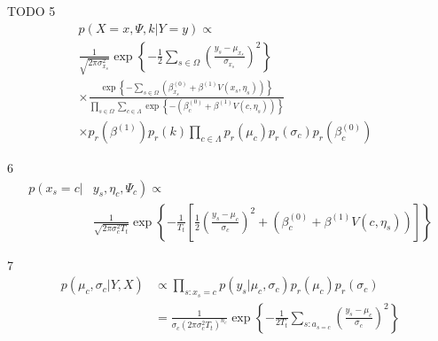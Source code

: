 \documentclass[10pt,letterpaper]{article}
\begin{document}
TODO
5
\begin{equation}
\begin{aligned}
p(X=x, \Psi, k | Y=y) \propto & \\
\frac{1}{\sqrt{2 \pi \sigma_{x_{s}}^{2}}} \exp \left\{-\frac{1}{2} \sum_{s \in \Omega}\left(\frac{y_{s}-\mu_{x_{s}}}{\sigma_{x_{s}}}\right)^{2}\right\} \\
\times \frac{\exp \left\{-\sum_{s \in \Omega}\left(\beta_{x_{s}}^{(0)}+\beta^{(1)} V\left(x_{s}, \eta_{s}\right)\right)\right\}}{\prod_{s \in \Omega} \sum_{c \in \Lambda} \exp \left\{-\left(\beta_{c}^{(0)}+\beta^{(1)} V\left(c, \eta_{s}\right)\right)\right\}} \\
\times p_{r}\left(\beta^{(1)}\right) p_{r}(k) \prod_{c \in \Lambda} p_{r}\left(\mu_{c}\right) p_{r}\left(\sigma_{c}\right) p_{r}\left(\beta_{c}^{(0)}\right)
\end{aligned}
\end{equation}

6
\begin{equation}
\begin{aligned}
p\left(x_{s}=c |\right.&\left.y_{s}, \eta_{c}, \Psi_{c}\right) \propto \\
& \frac{1}{\sqrt{2 \pi \sigma_{c}^{2} T_{t}}} \exp \left\{-\frac{1}{T_{t}}\left[\frac{1}{2}\left(\frac{y_{s}-\mu_{c}}{\sigma_{c}}\right)^{2}+\left(\beta_{c}^{(0)}+\beta^{(1)} V\left(c, \eta_{s}\right)\right)\right]\right\}
\end{aligned}
\end{equation}


7
\begin{equation}
\begin{aligned}
p\left(\mu_{c}, \sigma_{c} | Y, X\right) & \propto \prod_{s: x_{s}=c} p\left(y_{s} | \mu_{c}, \sigma_{c}\right) p_{r}\left(\mu_{c}\right) p_{r}\left(\sigma_{c}\right) \\
&=\frac{1}{\sigma_{c}\left(2 \pi \sigma_{c}^{2} T_{t}\right)^{n_{c}}} \exp \left\{-\frac{1}{2 T_{t}} \sum_{s: a_{s=c}}\left(\frac{y_{s}-\mu_{c}}{\sigma_{c}}\right)^{2}\right\}
\end{aligned}
\end{equation}
\end{document}

